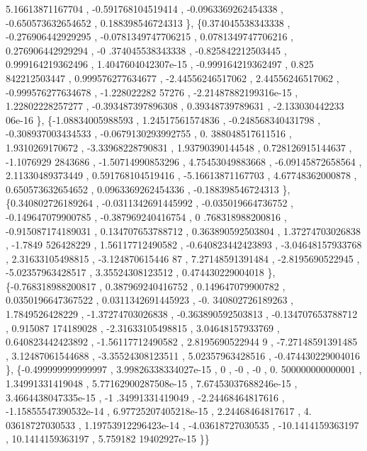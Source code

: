 \begin{DoxyCode}
       5.16613871167704 , -0.591768104519414 , -0.0963369262454338 , -0.650573632654652 , 0.188398546724313 \},
\{0.374045538343338 , -0.276906442929295 , -0.0781349747706215 , 0.0781349747706216 , 0.276906442929294 , -0
      .374045538343338 , -0.825842212503445 , 0.999164219362496 , 1.4047604042307e-15 , -0.999164219362497 , 0.825
      842212503447 , 0.999576277634677 , -2.44556246517062 ,  2.44556246517062 , -0.999576277634678 , -1.228022282
      57276 , -2.21487882199316e-15 ,  1.22802228257277 , -0.393487397896308 ,  0.39348739789631 , -2.133030442233
      06e-16 \},
\{-1.08834005988593 ,  1.24517561574836 , -0.248568340431798 , -0.308937003434533 , -0.0679130293992755 , 0.
      388048517611516 ,   1.9310269170672 , -3.33968228790831 ,  1.93790390144548 , 0.728126915144637 , -1.1076929
      2843686 , -1.50714990853296 ,  4.75453049883668 , -6.09145872658564 ,  2.11330489373449 , 0.591768104519416 
      , -5.16613871167703 ,  4.67748362000878 , 0.650573632654652 , 0.0963369262454336 , -0.188398546724313 \},
\{0.340802726189264 , -0.0311342691445992 , -0.035019664736752 , -0.149647079900785 , -0.387969240416754 , 0
      .768318988200816 , -0.915087174189031 , 0.134707653788712 , 0.363890592503804 ,  1.37274703026838 ,  -1.7849
      526428229 ,  1.56117712490582 , -0.640823442423893 , -3.04648157933768 ,  2.31633105498815 , -3.124870615446
      87 ,  7.27148591391484 ,  -2.8195690522945 , -5.02357963428517 ,  3.35524308123512 , 0.474430229004018 \},
\{-0.768318988200817 , 0.387969240416752 , 0.149647079900782 , 0.0350196647367522 , 0.0311342691445923 , -0.
      340802726189263 ,   1.7849526428229 , -1.37274703026838 , -0.363890592503813 , -0.134707653788712 , 0.915087
      174189028 , -2.31633105498815 ,  3.04648157933769 , 0.640823442423892 , -1.56117712490582 ,  2.8195690522944
      9 , -7.27148591391485 ,  3.12487061544688 , -3.35524308123511 ,  5.02357963428516 , -0.474430229004016 \},
\{-0.499999999999997 , 3.99826338334027e-15 ,                 0 ,                -0 ,                -0 , 0.
      500000000000001 ,  1.34991331419048 , 5.77162900287508e-15 , 7.67453037688246e-15 , 3.4664438047335e-15 , -1
      .34991331419049 , -2.24468464817616 , -1.15855547390532e-14 , 6.97725207405218e-15 ,  2.24468464817617 ,  4.
      03618727030533 , 1.19753912296423e-14 , -4.03618727030535 , -10.1414159363197 ,  10.1414159363197 , 5.759182
      19402927e-15 \}\}
\end{DoxyCode}
\mbox{\label{a00518_ae5879986c23478332a7ea6d4ec0bd535}} 
